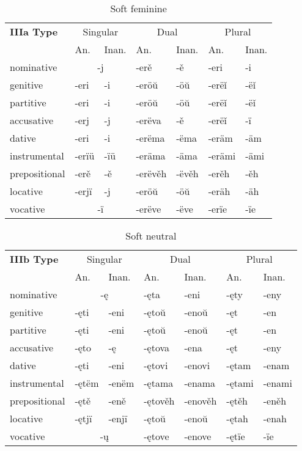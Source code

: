 \begin{table}[!htb]
	\caption{Soft feminine}
	\begin{tabular}{p{3em}llllll}
		\textbf{IIIa Type}       
		& \multicolumn{2}{c}{Singular} 
		& \multicolumn{2}{c}{Dual} 
		& \multicolumn{2}{c}{Plural} \\
		& An.   & Inan.  & An.   & Inan.   & An.  & Inan. \\
		\gls{nominative}    & \multicolumn{2}{c}{-j}      
		& -erě & -ě        
		& -eri & -i \\
		\gls{genitive}      & -eri & -i 
		& -eröŭ & -öŭ
		& -erëǐ & -ëǐ \\
		\gls{partitive}     & -eri & -i 
		& -eröŭ & -öŭ
		& -erëǐ & -ëǐ \\
		\gls{accusative}    & -erj & -j     
		& -erëva & -ě
		& -erëǐ & -ï  \\
		\gls{dative}		  & -eri & -i
		& -erëma & -ëma 
		& -eräm & -äm \\  
		\gls{instrumental}  & -erïü & -ïü     
		& -eräma & -äma   
		& -erämi & -ämi \\
		\gls{prepositional} & -erě & -ě   
		& -erëvěh & -ëvěh     
		& -erěh & -ěh \\
		\gls{locative}      & -erjï & -j      
		& -eröŭ & -öŭ
		& -eräh & -äh \\
		\gls{vocative}      & \multicolumn{2}{c}{-ï}       
		& -erëve & -ëve
		& -erïe & -ïe 
	\end{tabular}
\end{table}

\begin{table}[!htb]
	\caption{Soft neutral}
	\begin{tabular}{p{3em}llllll}
		\textbf{IIIb Type}       
		& \multicolumn{2}{c}{Singular} 
		& \multicolumn{2}{c}{Dual} 
		& \multicolumn{2}{c}{Plural} \\
		& An.   & Inan.  & An.   & Inan.   & An.  & Inan. \\
		\gls{nominative}    & \multicolumn{2}{c}{-ę}      
		& -ęta  & -eni        
		& -ęty & -eny \\
		\gls{genitive}      & -ęti & -eni 
		& -ętoŭ & -enoŭ
		& -ęt & -en \\
		\gls{partitive}     & -ęti & -eni 
		& -ętoŭ & -enoŭ
		& -ęt & -en \\
		\gls{accusative}    & -ęto & -ę     
		& -ętova & -ena
		& -ęt & -eny  \\
		\gls{dative}		  & -ęti & -eni
		& -ętovi & -enovi 
		& -ętam & -enam \\  
		\gls{instrumental}  & -ętëm & -enëm     
		& -ętama & -enama   
		& -ętami & -enami \\
		\gls{prepositional} & -ętě & -eně   
		& -ętověh & -enověh     
		& -ętěh & -eněh \\
		\gls{locative}      & -ętjï & -enjï      
		& -ętoŭ & -enoŭ
		& -ętah & -enah \\
		\gls{vocative}      & \multicolumn{2}{c}{-ų}       
		& -ętove & -enove
		& -ętïe & -ïe 
	\end{tabular}
\end{table}